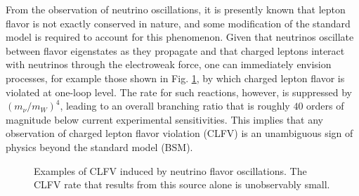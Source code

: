 \documentclass{book}[letterpaper,12pt]
\begin{document}
From the observation of neutrino oscillations, it is presently known that lepton flavor is not exactly conserved in nature, and some modification of the standard model is required to account for this phenomenon. Given that neutrinos oscillate between flavor eigenstates as they propagate and that charged leptons interact with neutrinos through the electroweak force, one can immediately envision processes, for example those shown in Fig. \ref{fig:neutrino_clfv}, by which charged lepton flavor is violated at one-loop level. The rate for such reactions, however, is suppressed by $(m_{\nu}/m_W)^4$, leading to an overall branching ratio that is roughly $40$ orders of magnitude below current experimental sensitivities. This implies that any observation of charged lepton flavor violation (CLFV) is an unambiguous sign of physics beyond the standard model (BSM).

\begin{figure}
\centering
{}
\hspace{5cm}
\caption{Examples of CLFV induced by neutrino flavor oscillations. The CLFV rate that results from this source alone is unobservably small.}
\label{fig:neutrino_clfv}
\end{figure}
 
\end{document}
